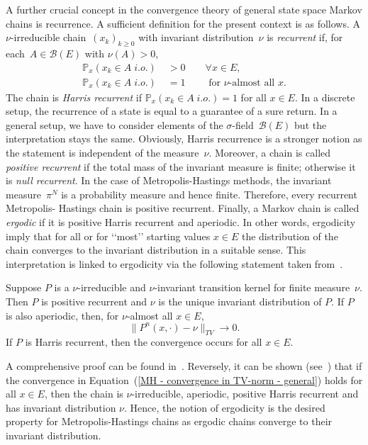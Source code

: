 A further crucial concept in the convergence theory of general state space Markov chains is recurrence. A sufficient definition for the present context is as follows. A $\nu$-irreducible chain~$(x_k)_{k \geq 0} $ with invariant distribution~$\nu$ is \textit{recurrent} if, for each~$A \in \mathcal{B}(E) $ with $\nu(A) > 0 $, 
\begin{align}
 \mathbb{P}_x (x_k \in A \; i.o. ) & \; > 0 \qquad \forall x \in E, \\
 \mathbb{P}_x (x_k \in A \; i.o.) & \; = 1 \qquad \text{ for $\nu$-almost all } x.
\end{align}
The chain is \textit{Harris recurrent} if $ \mathbb{P}_x(x_k \in A \; i.o.) = 1 $ for all $x \in E$. In a discrete setup, the recurrence of a state is equal to a guarantee of a sure return. In a general setup, we have to consider elements of the $\sigma$-field~$\mathcal{B}(E)$ but the interpretation stays the same. Obviously, Harris recurrence is a stronger notion as the statement is independent of the measure~$\nu$. Moreover, a chain is called \textit{positive recurrent} if the total mass of the invariant measure is finite; otherwise it is \textit{null recurrent}. In the case of Metropolis-Hastings methods, the invariant measure~$\pi^{N}$ is a probability measure and hence finite. Therefore, every recurrent Metropolis- Hastings chain is positive recurrent. Finally, a Markov chain is called \textit{ergodic} if it is positive Harris recurrent and aperiodic. In other words, ergodicity imply that for all or for ‘‘most’’ starting values $x \in E$ the distribution of the chain converges to the invariant distribution in a suitable sense. This interpretation is linked to ergodicity via the following statement taken from~\autocite{Tierny1994}.

\begin{thm}\autocite[Theorem 1]{Tierny1994}
\label{Theorem - convergence}
 Suppose $P$ is a $\nu$-irreducible and $\nu$-invariant transition kernel for finite measure~$\nu$. Then $P$ is positive recurrent and $\nu$ is the unique invariant distribution of $P$. If $P$ is also aperiodic, then, for $\nu$-almost all $x \in E$,
 \begin{equation}
 \label{MH - convergence in TV-norm - general}
  \| P^n (x, \cdot) - \nu \|_{TV} \to 0.
 \end{equation}
 If $P$ is Harris recurrent, then the convergence occurs for all $x \in E$.

\end{thm}

A comprehensive proof can be found in~\autocite{Athreya1996}. Reversely, it can be shown (see~\autocite{Tierny1994}) that if the convergence in Equation~(\ref{MH - convergence in TV-norm - general}) holds for all $x \in E$, then the chain is $\nu$-irreducible, aperiodic, positive Harris recurrent and has invariant distribution $\nu$. Hence, the notion of ergodicity is the desired property for Metropolis-Hastings chains as ergodic chains converge to their invariant distribution.



